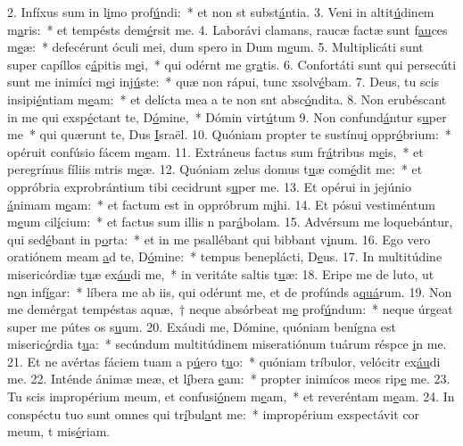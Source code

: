 2. Infíxus sum in l\uline{i}mo prof\uline{ú}ndi:~* et non st subst\uline{á}ntia.
3. Veni in altit\uline{ú}dinem m\uline{a}ris:~* et tempésts dem\uline{é}rsit me.
4. Laborávi clamans, raucæ factæ sunt f\uline{au}ces m\uline{e}æ:~* defecérunt óculi mei, dum spero in Dum m\uline{e}um.
5. Multiplicáti sunt super capíllos c\uline{á}pitis m\uline{e}i,~* qui odérnt me gr\uline{a}tis.
6. Confortáti sunt qui persecúti sunt me inimíci m\uline{e}i inj\uline{ú}ste:~* quæ non rápui, tunc xsolv\uline{é}bam.
7. Deus, tu scis insipi\uline{é}ntiam m\uline{e}am:~* et delícta mea a te non snt absc\uline{ó}ndita.
8. Non erubéscant in me qui exsp\uline{é}ctant te, D\uline{ó}mine,~* Dómin virt\uline{ú}tum
9. Non confund\uline{á}ntur s\uline{u}per me~* qui quærunt te, Dus \uline{I}sraël.
10. Quóniam propter te sustínu\uline{i} oppr\uline{ó}brium:~* opéruit confúsio fácem m\uline{e}am.
11. Extráneus factus sum fr\uline{á}tribus m\uline{e}is,~* et peregrínus fíliis mtris m\uline{e}æ.
12. Quóniam zelus domus t\uline{u}æ com\uline{é}dit me:~* et oppróbria exprobrántium tibi cecidrunt s\uline{u}per me.
13. Et opérui in jejúnio \uline{á}nimam m\uline{e}am:~* et factum est in oppróbrum m\uline{i}hi.
14. Et pósui vestiméntum m\uline{e}um cil\uline{í}cium:~* et factus sum illis n par\uline{á}bolam.
15. Advérsum me loquebántur, qui sed\uline{é}bant in p\uline{o}rta:~* et in me psallébant qui bibbant v\uline{i}num.
16. Ego vero oratiónem meam \uline{a}d te, D\uline{ó}mine:~* tempus beneplácti, D\uline{e}us.
17. In multitúdine misericórdiæ t\uline{u}æ ex\uline{áu}di me,~* in veritáte saltis t\uline{u}æ:
18. Eripe me de luto, ut n\uline{o}n inf\uline{í}gar:~* líbera me ab iis, qui odérunt me, et de profúnds a\uline{quá}rum.
19. Non me demérgat tempéstas aquæ,~† neque absórbeat m\uline{e} prof\uline{ú}ndum:~* neque úrgeat super me pútes os s\uline{u}um.
20. Exáudi me, Dómine, quóniam benígna est miseric\uline{ó}rdia t\uline{u}a:~* secúndum multitúdinem miseratiónum tuárum réspce \uline{i}n me.
21. Et ne avértas fáciem tuam a p\uline{ú}ero t\uline{u}o:~* quóniam tríbulor, velócitr ex\uline{áu}di me.
22. Inténde ánimæ meæ, et l\uline{í}bera \uline{e}am:~* propter inimícos meos rip\uline{e} me.
23. Tu scis impropérium meum, et confusi\uline{ó}nem m\uline{e}am,~* et reveréntam m\uline{e}am.
24. In conspéctu tuo sunt omnes qui tr\uline{í}bul\uline{a}nt me:~* impropérium exspectávit cor meum, t mis\uline{é}riam.

